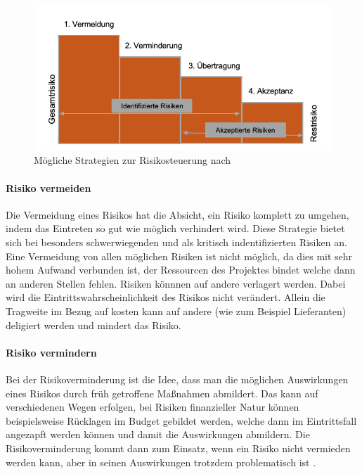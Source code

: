 \documentclass[ThesisDJ.tex]{subfiles}
\begin{document}
\begin{figure}
    \centering
    \includegraphics[width=\linewidth]{risiken.png}
    \caption{Mögliche Strategien zur Risikosteuerung nach \cite{cicek2022risikomanagement}}
    \label{fig:riskstrats}
\end{figure}

\paragraph{Risiko vermeiden}
Die Vermeidung eines Risikos hat die Absicht, ein Risiko komplett zu umgehen, indem das Eintreten so gut wie möglich verhindert wird. Diese Strategie bietet sich bei besonders schwerwiegenden und als kritisch indentifizierten Risiken an. Eine Vermeidung von allen möglichen Risiken ist nicht möglich, da dies mit sehr hohem Aufwand verbunden ist, der Ressourcen des Projektes bindet welche dann an anderen Stellen fehlen.
Risiken könnnen auf andere verlagert werden. Dabei wird die Eintrittswahrscheinlichkeit des Risikos nicht verändert. Allein die Tragweite im Bezug auf kosten kann auf andere (wie zum Beispiel Lieferanten) deligiert werden und mindert das Risiko.


\paragraph{Risiko vermindern}
Bei der Risikoverminderung ist die Idee, dass man die möglichen Auswirkungen eines Risikos durch früh getroffene Maßnahmen abmildert. Das kann auf verschiedenen Wegen erfolgen, bei Risiken finanzieller Natur können beispielsweise Rücklagen im Budget gebildet werden, welche dann im Eintrittsfall angezapft werden können und damit die Auswirkungen abmildern. Die Risikoverminderung kommt dann zum Einsatz, wenn ein Risiko nicht vermieden werden kann, aber in seinen Auswirkungen trotzdem problematisch ist \cite{dechange_projektmanagement_2024}.
\end{document}
